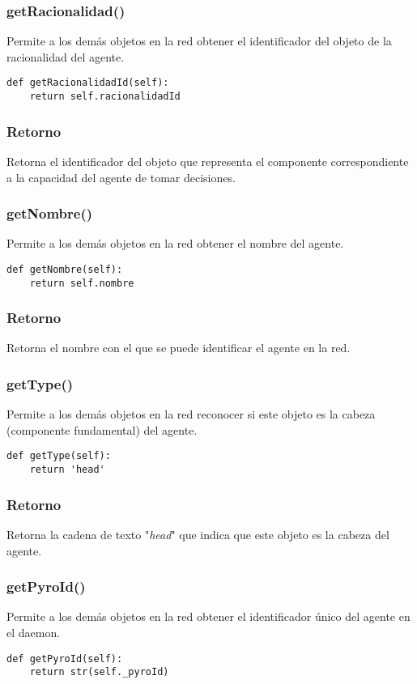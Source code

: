 \documentclass{article}
\begin{document}
\subsubsection{\textbf{getRacionalidad}()}
Permite a los demás objetos en la red obtener el identificador del objeto de la racionalidad del agente.
\begin{lstlisting}
def getRacionalidadId(self):
	return self.racionalidadId
\end{lstlisting}
\subsubsection*{Retorno}
Retorna el identificador del objeto que representa el componente correspondiente a la capacidad del agente de tomar decisiones.
\subsubsection{\textbf{getNombre}()}
Permite a los demás objetos en la red obtener el nombre del agente.
\begin{lstlisting}
def getNombre(self):
	return self.nombre
\end{lstlisting}
\subsubsection*{Retorno}
Retorna el nombre con el que se puede identificar el agente en la red.
\subsubsection{\textbf{getType}()}
Permite a los demás objetos en la red reconocer si este objeto es la cabeza (componente fundamental) del agente.
\begin{lstlisting}
def getType(self):
	return 'head'
\end{lstlisting}
\subsubsection*{Retorno}
Retorna la cadena de texto "\textit{head}" que indica que este objeto es la cabeza del agente.
\subsubsection{\textbf{getPyroId}()}
Permite a los demás objetos en la red obtener el identificador único del agente en el daemon.
\begin{lstlisting}
def getPyroId(self):
	return str(self._pyroId)
\end{lstlisting}
\end{document}
